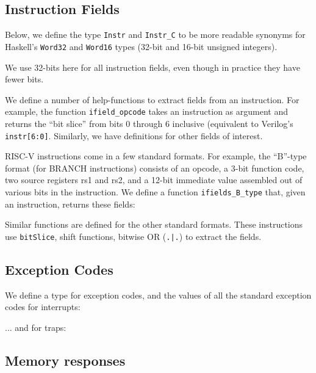 \documentclass[11pt]{article}
\begin{document}
\subsection{Instruction Fields}

Below, we define the type {\tt Instr} and {\tt Instr\_C} to be more
readable synonyms for Haskell's {\tt Word32} and {\tt Word16} types
(32-bit and 16-bit unsigned integers).

We use 32-bits here for all instruction fields, even though
in practice they have fewer bits.



We define a number of help-functions to extract fields from an
instruction.  For example, the function {\tt ifield\_opcode} takes an
instruction as argument and returns the ``bit slice'' from bits 0
through 6 inclusive (equivalent to Verilog's {\tt instr[6:0]}.
Similarly, we have definitions for other fields of interest.



RISC-V instructions come in a few standard formats.  For example, the
``B''-type format (for BRANCH instructions) consists of an opcode, a
3-bit function code, two source registers rs1 and rs2, and a 12-bit
immediate value assembled out of various bits in the instruction.  We
define a function \verb|ifields_B_type| that, given an instruction,
returns these fields:



Similar functions are defined for the other standard formats.  These
instructions use \verb|bitSlice|, shift functions, bitwise OR
(\verb/.|./) to extract the fields.


\subsection{Exception Codes}

We define a type for exception codes, and the values of all the standard exception codes for interrupts:



... and for traps:




\subsection{Memory responses}
\end{document}
